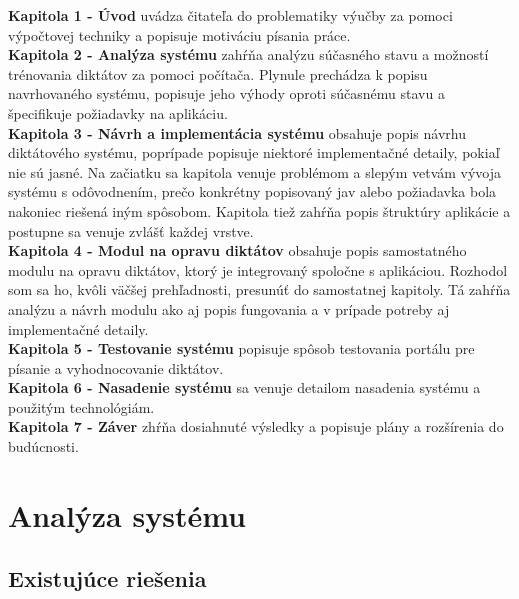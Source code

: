 \documentclass[12pt,oneside]{fithesis2}
\begin{document}
    \textbf{Kapitola 1 -  Úvod} uvádza čitateľa do problematiky výučby za pomoci výpočtovej techniky a popisuje motiváciu písania práce. \\
    \textbf{Kapitola 2 - Analýza systému} zahŕňa analýzu súčasného stavu a možností trénovania diktátov za pomoci počítača. Plynule prechádza k popisu navrhovaného systému, popisuje jeho výhody oproti súčasnému stavu a špecifikuje požiadavky na aplikáciu. \\
    \textbf{Kapitola 3 - Návrh a implementácia systému} obsahuje popis návrhu diktátového systému, poprípade popisuje niektoré implementačné detaily, pokiaľ nie sú jasné. Na začiatku sa kapitola venuje problémom a slepým vetvám vývoja systému s odôvodnením, prečo konkrétny popisovaný jav alebo požiadavka bola nakoniec riešená iným spôsobom. Kapitola tiež zahŕňa popis štruktúry aplikácie a postupne sa venuje zvlášť každej vrstve. \\
    \textbf{Kapitola 4 - Modul na opravu diktátov} obsahuje popis samostatného modulu na opravu diktátov, ktorý je integrovaný spoločne s aplikáciou. Rozhodol som sa ho, kvôli väčšej prehľadnosti, presunúť do samostatnej kapitoly. Tá zahŕňa analýzu a návrh modulu ako aj popis fungovania a v prípade potreby aj implementačné detaily. \\
	\textbf{Kapitola 5 - Testovanie systému} popisuje spôsob testovania portálu pre písanie a vyhodnocovanie diktátov. \\
	\textbf{Kapitola 6 - Nasadenie systému} sa venuje detailom nasadenia systému a použitým technológiám. \\
	\textbf{Kapitola 7 - Záver} zhŕňa dosiahnuté výsledky a popisuje plány a rozšírenia do budúcnosti.
    
    
    \chapter{Analýza systému}

       \section{Existujúce riešenia}       
\end{document}
